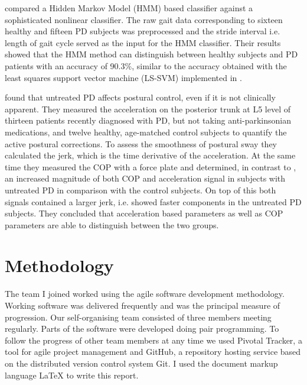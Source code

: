 \citeauthor{khorasani_hmm_2014} \cite{khorasani_hmm_2014} compared a Hidden Markov Model (HMM) based classifier against a sophisticated nonlinear classifier. The raw gait data corresponding to sixteen healthy and fifteen PD subjects was preprocessed and the stride interval i.e. length of gait cycle served as the input for the HMM classifier. Their results showed that the HMM method can distinguish between healthy subjects and PD patients with an accuracy of 90.3\%, similar to the accuracy obtained with the least squares support vector machine (LS-SVM) implemented in \cite{wu_statistical_2010}.

\citeauthor{mancini_isway:_2012} \cite{mancini_isway:_2012} found that untreated PD affects postural control, even if it is not clinically apparent. They measured the acceleration on the posterior trunk at L5 level of thirteen patients recently diagnosed with PD, but not taking anti-parkinsonian medications, and twelve healthy, age-matched control subjects to quantify the active postural corrections. To assess the smoothness of postural sway they calculated the jerk, which is the time derivative of the acceleration. At the same time they measured the COP with a force plate and determined, in contrast to \cite{mancini_anticipatory_2009}, an increased magnitude of both COP and acceleration signal in subjects with untreated PD in comparison with the control subjects. On top of this both signals contained a larger jerk, i.e. showed faster components in the untreated PD subjects. They concluded that acceleration based parameters as well as COP parameters are able to distinguish between the two groups. 

\section{Methodology}

The team I joined worked using the agile software development methodology. Working software was delivered frequently and was the principal measure of progression. Our self-organising team consisted of three members meeting regularly. Parts of the software were developed doing pair programming. To follow the progress of other team members at any time we used Pivotal Tracker, a tool for agile project management and GitHub, a repository hosting service based on the distributed version control system Git. I used the document markup language \LaTeX{} to write this report.
